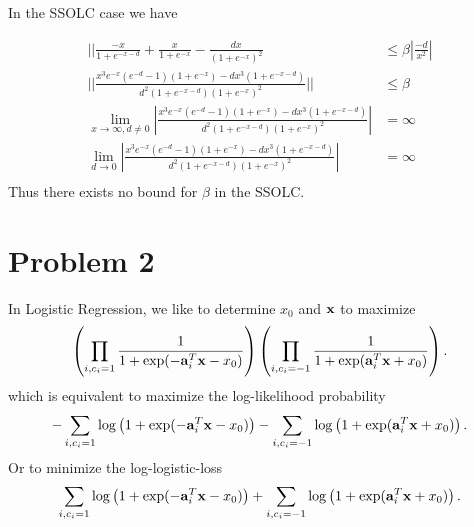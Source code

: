 \documentclass[answers]{exam} %
\renewcommand\a{{\bf a}}
\newcommand\x{{\bf x}}
\renewcommand\a{{\bf a}}
\begin{document}
\begin{itemize}
\begin{framed}


 In the SSOLC case we have


\begin{equation*}
\begin{aligned}
|| \frac{-x}{1 + e^{-x -d}} + \frac{ x}{1 + e^{-x}} - \frac{dx}{( 1 + e^{-x})^2} &\leq \beta |\frac{-d}{x^2} | \\ 
||\frac{ x^{3} e^{-x}( e^{-d} - 1)(1 + e^{-x}) - dx^3 (1 + e^{-x -d})}{ d^2 ( 1 + e^{-x - d} )(1 + e^{-x})^2}|| &\leq \beta \\ 
\lim_{x \to \infty, d \neq 0}  |\frac{ x^{3} e^{-x}( e^{-d} - 1)(1 + e^{-x}) - dx^3 (1 + e^{-x -d})}{ d^2 ( 1 + e^{-x - d} )(1 + e^{-x})^2}| &= \infty \\ 
\lim_{d \to 0}  |\frac{ x^{3} e^{-x}( e^{-d} - 1)(1 + e^{-x}) - dx^3 (1 + e^{-x -d})}{ d^2 ( 1 + e^{-x - d} )(1 + e^{-x})^2}| &= \infty \\ 
\end{aligned}
\end{equation*}
Thus there exists no bound for $\beta$ in the SSOLC. 


\end{framed}
\end{itemize}


\section*{Problem 2}
In Logistic Regression, we like to determine $x_0$ and $\x$ to maximize
\[
\left(\prod_{i,c_i=1}\frac{1}{1+\exp(-\a_i^T\x-x_0)}\right)
\left(\prod_{i,c_i=-1}\frac{1}{1+\exp(\a_i^T\x+x_0)}\right).
\]
which is equivalent to maximize the log-likelihood probability
\[
-\sum_{i,c_i=1}\log\left(1+\exp(-\a_i^T\x-x_0)\right)-\sum_{i,c_i=-1}\log\left(1+\exp(\a_i^T\x+x_0)\right).
\]
Or to minimize the log-logistic-loss
\[
\sum_{i,c_i=1}\log\left(1+\exp(-\a_i^T\x-x_0)\right)+\sum_{i,c_i=-1}\log\left(1+\exp(\a_i^T\x+x_0)\right).
\]
\end{document}
